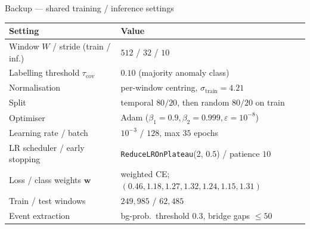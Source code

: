 \documentclass[11pt, aspectratio=169]{beamer}
\begin{document}
\appendix

\begin{frame}{Backup --- shared training / inference settings}
  \begin{table}
    \centering\footnotesize
    \begin{tabular}{ll}
      \toprule
      Setting & Value \\
      \midrule
      Window $W$ / stride (train / inf.)     & $512$ \;/\; $32$ \;/\; $10$ \\
      Labelling threshold $\tau_{\mathrm{cov}}$ & $0.10$ (majority anomaly class) \\
      Normalisation                          & per-window centring, $\sigma_{\mathrm{train}}=4.21$ \\
      Split                                  & temporal $80/20$, then random $80/20$ on train \\
      Optimiser                              & Adam ($\beta_1{=}0.9,\beta_2{=}0.999,\varepsilon{=}10^{-8}$) \\
      Learning rate / batch                  & $10^{-3}$ / $128$, max $35$ epochs \\
      LR scheduler / early stopping          & \texttt{ReduceLROnPlateau}(2, $0.5$) / patience $10$ \\
      Loss / class weights $\mathbf{w}$      & weighted CE; $(0.46,1.18,1.27,1.32,1.24,1.15,1.31)$ \\
      Train / test windows                   & $249{,}985$ / $62{,}485$ \\
      Event extraction                       & bg-prob.\ threshold $0.3$, bridge gaps $\le 50$ \\
      \bottomrule
    \end{tabular}
  \end{table}
\end{frame}
\end{document}
